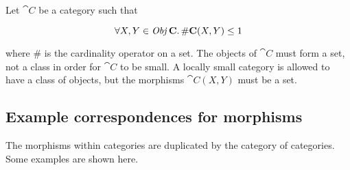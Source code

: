 Let $\cat{C}$ be a category such that

\begin{equation*}
\forall X,Y \in \operatorname{\mathit{Obj}}{\mathbf{C}} \ldotp \# \mathbf{C}(X, Y) \leq 1
\end{equation*}

where $\#$ is the cardinality operator on a set. The objects of $\cat{C}$ must
form a set, not a class in order for $\cat{C}$ to be small. A locally small
category is allowed to have a class of objects, but the morphisms $\cat{C}(X, Y)$
must be a set.

\subsection{Example correspondences for morphisms}

The morphisms within categories are duplicated by the category of categories. Some examples are shown here.

